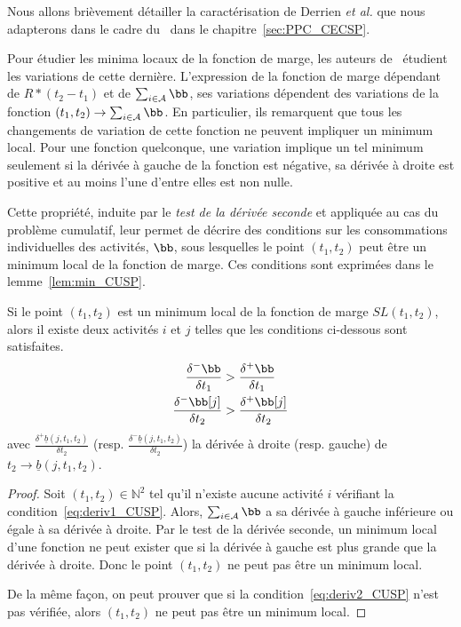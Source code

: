 Nous allons brièvement détailler la caractérisation de Derrien {\it et
al.} que nous adapterons dans le cadre du \CECSP~dans le
chapitre~\ref{sec:PPC_CECSP}.

Pour étudier les minima locaux de la fonction de marge, les auteurs
de~\cite{DP} étudient les variations de cette dernière. L'expression
de la fonction de marge dépendant de $R*(t_2-t_1)$ et de $\sum_{i \in
  \A} \bb$, ses variations dépendent des variations de la fonction
$(t_1,t_2) \rightarrow \sum_{i \in \A} \bb$. En particulier, ils
remarquent que tous les changements de variation de cette fonction ne
peuvent impliquer un minimum local. Pour une fonction quelconque, une
variation implique un tel minimum seulement si la dérivée à gauche de
la fonction est négative, sa dérivée à droite est positive et au moins
l'une d'entre elles est non nulle. 

Cette propriété, induite par le {\it test de la dérivée seconde} et
appliquée au cas du problème cumulatif, leur permet de décrire des
conditions sur les consommations individuelles des activités, $\bb$,
sous lesquelles le point $(t_1,t_2)$ peut être un minimum local de la
fonction de marge. Ces conditions sont exprimées dans le
lemme~\ref{lem:min_CUSP}.

\begin{lemma}
\label{lem:min_CUSP}
Si le point $(t_1,t_2)$ est un minimum local de la fonction de marge
$SL(t_1,t_2)$, alors il existe deux activités $i$ et $j$ telles que les
conditions ci-dessous sont satisfaites. 
\begin{align} \frac{\delta^{-}\bb}{\delta t_1} &>
\frac{\delta^{+}\bb}{\delta t_1} \label{eq:deriv1_CUSP}\\ 
\frac{\delta^{-}\bb[j]}{\delta t_2}
& > \frac{\delta^{+}\bb[j]}{\delta t_2} \label{eq:deriv2_CUSP}
\end{align}
avec $\frac{\delta^{+} \underline{b}(j,t_1,t_2)}{\delta
t_2}$ (resp. $\frac{\delta^{-} \underline{b}(j,t_1,t_2)}{\delta t_2}$)
la dérivée à droite (resp. gauche) de $t_2\rightarrow \underline{b}(j,t_1,t_2)$.
\end{lemma}

\begin{proof}
Soit $(t_1,t_2) \in \mathbb{N}^2$ tel qu'il n'existe aucune activité
$i$ vérifiant la condition~\eqref{eq:deriv1_CUSP}. Alors, $\sum_{i \in
  \A} \bb$ a sa dérivée à gauche inférieure ou égale à sa dérivée à droite. Par
le test de la dérivée seconde, un minimum local d'une fonction ne peut
exister que si la dérivée à gauche est plus grande que la dérivée à
droite. Donc le point $(t_1,t_2)$ ne peut pas être un minimum local. 

De la même façon, on peut prouver que si la
condition~\eqref{eq:deriv2_CUSP} n'est pas vérifiée, alors $(t_1,t_2)$
ne peut pas être un minimum local. 
\end{proof}

